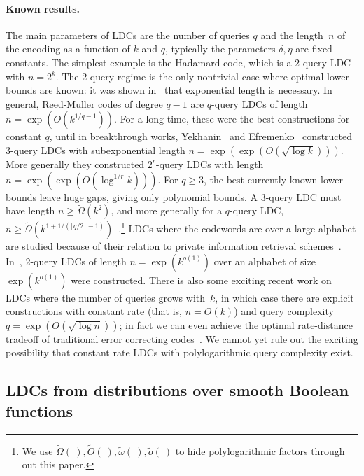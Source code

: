 \documentclass{toc}
\newcommand{\ceil}[1]{\lceil{#1}\rceil}
\begin{document}
\paragraph{Known results.}
The main parameters of LDCs are the number of queries $q$ and the length~$n$ of the encoding %
 as a function of $k$ and $q$, typically the parameters $\delta,\eta$ are fixed constants. The simplest example is the Hadamard code, which is a 2-query LDC with $n=2^k$. The 2-query regime is the only nontrivial case where optimal lower bounds are known: it was shown in~\cite{Kerenidis:2004,GKST02} that exponential length is necessary. In general, Reed-Muller codes of degree $q-1$ are $q$-query LDCs of length $n=\exp(O(k^{1/q-1}))$. For a long time, these were the best constructions for constant $q$, until in breakthrough works, Yekhanin~\cite{Yekhanin:2007} and Efremenko~\cite{Efremenko:2009} constructed $3$-query LDCs with subexponential length $n=\exp(\exp(O(\sqrt{\log k})))$. More generally they constructed $2^r$-query LDCs with length $n=\exp(\exp(O(\log^{1/r} k)))$. For $q\geq 3$, the best currently known lower bounds leave huge gaps, giving only polynomial bounds. A $3$-query LDC must have length $n\ge \tilde{\Omega}(k^2)$, and more generally for a $q$-query LDC, $n\ge \tilde{\Omega}(k^{1+1/(\ceil{q/2}-1)})$~\cite{Kerenidis:2004,Woodruff:2007a}.\footnote{We use $\tilde{\Omega}(\ ), \tilde{O}(\ ), \tilde{\omega}(\ ), \tilde{o}(\ )$ to hide polylogarithmic factors through out this paper.} LDCs where the codewords are over a large alphabet are studied because of their relation to private information retrieval schemes~\cite{CKGS98,Katz:2000}. In~\cite{DG15}, 2-query LDCs of length $n=\exp(k^{o(1)})$ over an alphabet of size $\exp(k^{o(1)})$ were constructed.
There is also some exciting recent work on LDCs where the number of queries grows with~$k$, in which case there are explicit constructions with constant rate (that is, $n = O(k)$)  and query complexity $q=\exp(O(\sqrt{\log n}))$; in fact we can even achieve the optimal rate-distance tradeoff of traditional error correcting codes~\cite{KSY10,KMRS16,GKORS16}. We cannot yet rule out the exciting possibility that constant rate LDCs with polylogarithmic query complexity exist.


%
\subsection{LDCs from distributions over smooth Boolean functions}
\end{document}
